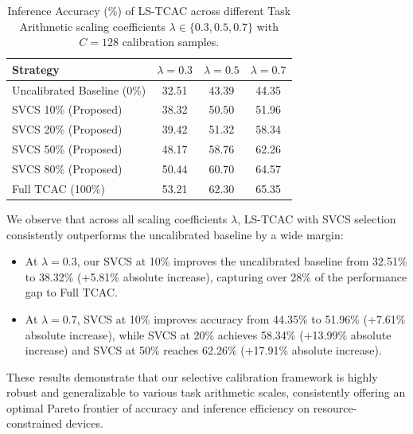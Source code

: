 \documentclass{article}
\theoremstyle{plain}
\theoremstyle{definition}
\theoremstyle{remark}
\begin{document}
\begin{table}[htbp]
\centering
\caption{Inference Accuracy (\%) of LS-TCAC across different Task Arithmetic scaling coefficients $\lambda \in \{0.3, 0.5, 0.7\}$ with $C=128$ calibration samples.}
\label{tab:lambda_ablation}
\vspace{1.5mm}
\begin{tabular}{lccc}
\toprule
\textbf{Strategy} & \textbf{$\lambda = 0.3$} & \textbf{$\lambda = 0.5$} & \textbf{$\lambda = 0.7$} \\
\midrule
Uncalibrated Baseline (0\%) & 32.51 & 43.39 & 44.35 \\
\midrule
SVCS 10\% (Proposed) & 38.32 & 50.50 & 51.96 \\
SVCS 20\% (Proposed) & 39.42 & 51.32 & 58.34 \\
SVCS 50\% (Proposed) & 48.17 & 58.76 & 62.26 \\
SVCS 80\% (Proposed) & 50.44 & 60.70 & 64.57 \\
\midrule
Full TCAC (100\%) & 53.21 & 62.30 & 65.35 \\
\bottomrule
\end{tabular}
\end{table}

We observe that across all scaling coefficients $\lambda$, LS-TCAC with SVCS selection consistently outperforms the uncalibrated baseline by a wide margin:
\begin{itemize}
    \item At $\lambda = 0.3$, our SVCS at 10\% improves the uncalibrated baseline from 32.51\% to 38.32\% (+5.81\% absolute increase), capturing over 28\% of the performance gap to Full TCAC.
    \item At $\lambda = 0.7$, SVCS at 10\% improves accuracy from 44.35\% to 51.96\% (+7.61\% absolute increase), while SVCS at 20\% achieves 58.34\% (+13.99\% absolute increase) and SVCS at 50\% reaches 62.26\% (+17.91\% absolute increase).
\end{itemize}
These results demonstrate that our selective calibration framework is highly robust and generalizable to various task arithmetic scales, consistently offering an optimal Pareto frontier of accuracy and inference efficiency on resource-constrained devices.
\end{document}
